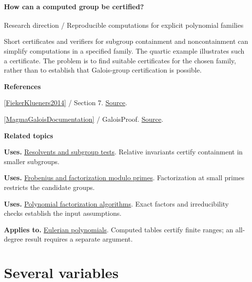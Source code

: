 \documentclass[11pt,a4paper,oneside,openany]{book}
\newenvironment{sources}{\par\smallskip\begingroup\footnotesize\color{atlasgray}\leftskip=10pt\setlength{\parskip}{2pt}}{\par\endgroup\smallskip}
\begin{document}
\subsection*{How can a computed group be certified?}
{\small\sffamily\color{atlasgold}Research direction / Reproducible computations for explicit polynomial families}\par\smallskip
\color{black} Short certificates and verifiers for subgroup containment and noncontainment can simplify computations in a specified family. The quartic example illustrates such a certificate. The problem is to find suitable certificates for the chosen family, rather than to establish that Galois-group certification is possible.\par
\begin{sources}
\textbf{References}\par\smallskip
\noindent\hyperlink{ref:FiekerKlueners2014}{[FiekerKlueners2014]} / Section 7.  \href{https://doi.org/10.1112/S1461157013000302}{Source}.\par
\noindent\hyperlink{ref:MagmaGaloisDocumentation}{[MagmaGaloisDocumentation]} / GaloisProof.  \href{https://docs.magma-maths.org/GlobalFields/GaloisGroupsAndAutomorphisms/galois.html}{Source}.\par
\end{sources}\color{black}
\par\medskip\begingroup\footnotesize\setlength{\parskip}{1pt}\textbf{\sffamily\color{atlasgreen}Related topics}\par
\color{black}\textbf{Uses.} \hyperlink{article:resolvents}{Resolvents and subgroup tests}. Relative invariants certify containment in smaller subgroups.\par
\color{black}\textbf{Uses.} \hyperlink{article:frobenius}{Frobenius and factorization modulo primes}. Factorization at small primes restricts the candidate groups.\par
\color{black}\textbf{Uses.} \hyperlink{article:factorization-algorithms}{Polynomial factorization algorithms}. Exact factors and irreducibility checks establish the input assumptions.\par
\color{black}\textbf{Applies to.} \hyperlink{article:eulerian}{Eulerian polynomials}. Computed tables certify finite ranges; an all-degree result requires a separate argument.\par
\endgroup
\part{Several variables}
\end{document}
